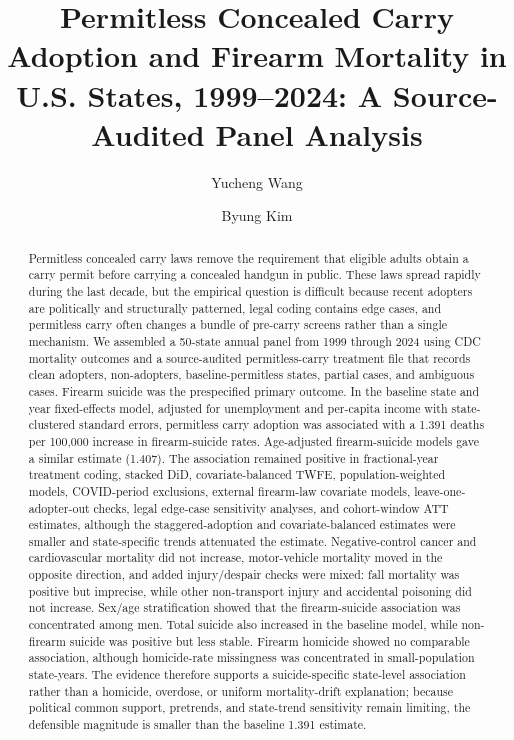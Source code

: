 \documentclass[11pt]{article}
\title{\bfseries Permitless Concealed Carry Adoption and Firearm Mortality in U.S. States, 1999--2024: A Source-Audited Panel Analysis}
\author[1]{Yucheng Wang}
\author[2]{Byung Kim}
\affil[1]{University of Wisconsin--Madison, Madison, WI, USA}
\affil[2]{United States Air Force Academy, Colorado Springs, CO, USA}
\affil[]{\textit{Yucheng Wang and Byung Kim contributed equally to this work.}}
\date{}
\begin{document}
\maketitle

\begin{abstract}
Permitless concealed carry laws remove the requirement that eligible adults obtain a carry permit before carrying a concealed handgun in public. These laws spread rapidly during the last decade, but the empirical question is difficult because recent adopters are politically and structurally patterned, legal coding contains edge cases, and permitless carry often changes a bundle of pre-carry screens rather than a single mechanism. We assembled a 50-state annual panel from 1999 through 2024 using CDC mortality outcomes and a source-audited permitless-carry treatment file that records clean adopters, non-adopters, baseline-permitless states, partial cases, and ambiguous cases. Firearm suicide was the prespecified primary outcome. In the baseline state and year fixed-effects model, adjusted for unemployment and per-capita income with state-clustered standard errors, permitless carry adoption was associated with a 1.391 deaths per 100,000 increase in firearm-suicide rates. Age-adjusted firearm-suicide models gave a similar estimate (1.407). The association remained positive in fractional-year treatment coding, stacked DiD, covariate-balanced TWFE, population-weighted models, COVID-period exclusions, external firearm-law covariate models, leave-one-adopter-out checks, legal edge-case sensitivity analyses, and cohort-window ATT estimates, although the staggered-adoption and covariate-balanced estimates were smaller and state-specific trends attenuated the estimate. Negative-control cancer and cardiovascular mortality did not increase, motor-vehicle mortality moved in the opposite direction, and added injury/despair checks were mixed: fall mortality was positive but imprecise, while other non-transport injury and accidental poisoning did not increase. Sex/age stratification showed that the firearm-suicide association was concentrated among men. Total suicide also increased in the baseline model, while non-firearm suicide was positive but less stable. Firearm homicide showed no comparable association, although homicide-rate missingness was concentrated in small-population state-years. The evidence therefore supports a suicide-specific state-level association rather than a homicide, overdose, or uniform mortality-drift explanation; because political common support, pretrends, and state-trend sensitivity remain limiting, the defensible magnitude is smaller than the baseline 1.391 estimate.
\end{abstract}
\end{document}
